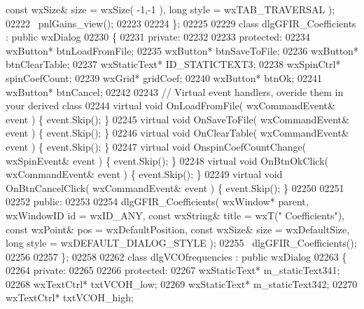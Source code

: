 \begin{DoxyCode}
{      const} wxSize& size = wxSize( -1,-1 ), \textcolor{keywordtype}{long} style = wxTAB\_TRAVERSAL ); 
02222         ~pnlGains_view();
02223     
02224 \};
02225 
02229 \textcolor{keyword}{class }dlgGFIR_Coefficients : \textcolor{keyword}{public} wxDialog 
02230 \{
02231     \textcolor{keyword}{private}:
02232     
02233     \textcolor{keyword}{protected}:
02234         wxButton* btnLoadFromFile;
02235         wxButton* btnSaveToFile;
02236         wxButton* btnClearTable;
02237         wxStaticText* ID_STATICTEXT3;
02238         wxSpinCtrl* spinCoefCount;
02239         wxGrid* gridCoef;
02240         wxButton* btnOk;
02241         wxButton* btnCancel;
02242         
02243         \textcolor{comment}{// Virtual event handlers, overide them in your derived class}
02244         \textcolor{keyword}{virtual} \textcolor{keywordtype}{void} OnLoadFromFile( wxCommandEvent& event ) \{ \textcolor{keyword}{event}.Skip(); \}
02245         \textcolor{keyword}{virtual} \textcolor{keywordtype}{void} OnSaveToFile( wxCommandEvent& event ) \{ \textcolor{keyword}{event}.Skip(); \}
02246         \textcolor{keyword}{virtual} \textcolor{keywordtype}{void} OnClearTable( wxCommandEvent& event ) \{ \textcolor{keyword}{event}.Skip(); \}
02247         \textcolor{keyword}{virtual} \textcolor{keywordtype}{void} OnspinCoefCountChange( wxSpinEvent& event ) \{ \textcolor{keyword}{event}.Skip(); \}
02248         \textcolor{keyword}{virtual} \textcolor{keywordtype}{void} OnBtnOkClick( wxCommandEvent& event ) \{ \textcolor{keyword}{event}.Skip(); \}
02249         \textcolor{keyword}{virtual} \textcolor{keywordtype}{void} OnBtnCancelClick( wxCommandEvent& event ) \{ \textcolor{keyword}{event}.Skip(); \}
02250         
02251     
02252     \textcolor{keyword}{public}:
02253         
02254         dlgGFIR_Coefficients( wxWindow* parent, wxWindowID \textcolor{keywordtype}{id} = wxID\_ANY, \textcolor{keyword}{const} wxString& title = wxT(\textcolor{stringliteral}{"
      Coefficients"}), \textcolor{keyword}{const} wxPoint& pos = wxDefaultPosition, \textcolor{keyword}{const} wxSize& size = wxDefaultSize, \textcolor{keywordtype}{long} style = 
      wxDEFAULT\_DIALOG\_STYLE ); 
02255         ~dlgGFIR_Coefficients();
02256     
02257 \};
02258 
02262 \textcolor{keyword}{class }dlgVCOfrequencies : \textcolor{keyword}{public} wxDialog 
02263 \{
02264     \textcolor{keyword}{private}:
02265     
02266     \textcolor{keyword}{protected}:
02267         wxStaticText* m_staticText341;
02268         wxTextCtrl* txtVCOH_low;
02269         wxStaticText* m_staticText342;
02270         wxTextCtrl* txtVCOH_high;

\end{DoxyCode}

